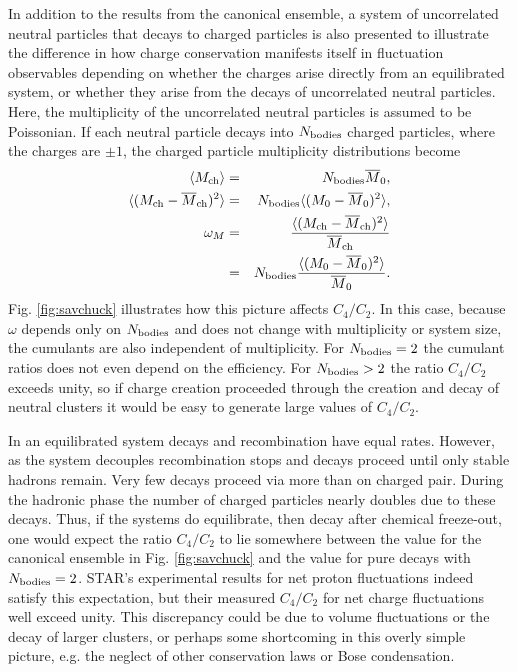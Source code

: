 \documentclass[aps,prc,nofootinbib,showpacs,superscriptaddress,groupedaddress]{revtex4-1}
\begin{document}
In addition to the results from the canonical ensemble, a system of uncorrelated neutral particles that decays to charged particles is also presented to illustrate the difference in how charge conservation manifests itself in fluctuation observables depending on whether the charges arise directly from an equilibrated system, or whether they arise from the decays of uncorrelated neutral particles. Here, the multiplicity of the uncorrelated neutral particles is assumed to be Poissonian. If each neutral particle decays into $N_{\rm bodies}$ charged particles, where the charges are $\pm 1$, the charged particle multiplicity distributions become 
\begin{eqnarray}
\langle M_{\rm ch}\rangle&=&N_{\rm bodies}\overline{M}_0,\\
\nonumber
\langle(M_{\rm ch}-\overline{M}_{\rm ch})^2\rangle&=&N_{\rm bodies}\langle(M_0-\overline{M}_0)^2\rangle,\\
\omega_M&=&\frac{\langle(M_{\rm ch}-\overline{M}_{\rm ch})^2\rangle}{\overline{M}_{\rm ch}}\\
&=&N_{\rm bodies}\frac{\langle(M_0-\overline{M}_0)^2\rangle}{\overline{M}_0}.
\end{eqnarray}
Fig. \ref{fig:savchuck} illustrates how this picture affects $C_4/C_2$. In this case, because $\omega$ depends only on $N_{\rm bodies}$ and does not change with multiplicity or system size, the cumulants are also independent of multiplicity. For $N_{\rm bodies}=2$ the cumulant ratios does not even depend on the efficiency. For $N_{\rm bodies}>2$ the ratio $C_4/C_2$ exceeds unity, so if charge creation proceeded through the creation and decay of neutral clusters it would be easy to generate large values of $C_4/C_2$. 

In an equilibrated system decays and recombination have equal rates. However, as the system decouples recombination stops and decays proceed until only stable hadrons remain. Very few decays proceed via more than on charged pair. During the hadronic phase the number of charged particles nearly doubles due to these decays. Thus, if the systems do equilibrate, then decay after chemical freeze-out, one would expect the ratio $C_4/C_2$ to lie somewhere between the value for the canonical ensemble in Fig. \ref{fig:savchuck} and the value for pure decays with $N_{\rm bodies}=2$. STAR's experimental results for net proton fluctuations indeed satisfy this expectation, but their measured $C_4/C_2$ for net charge fluctuations well exceed unity. This discrepancy could be due to volume fluctuations or the decay of larger clusters, or perhaps some shortcoming in this overly simple picture, e.g. the neglect of other conservation laws or Bose condensation. 
\end{document}
